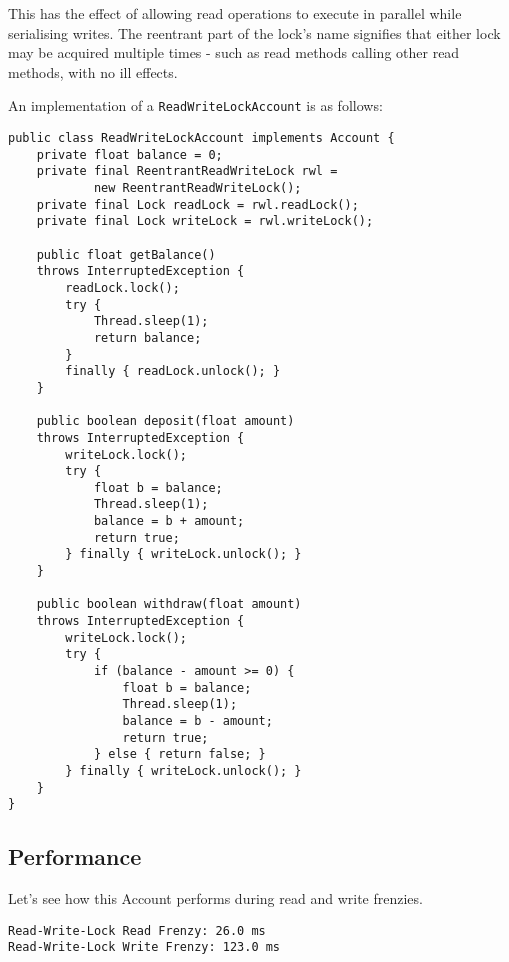 \documentclass[a4paper,12pt]{kth-mag}
\begin{document}
This has the effect of allowing read operations to execute in parallel while serialising writes. The reentrant part of the lock's name signifies that either lock may be acquired multiple times - such as read methods calling other read methods, with no ill effects.

An implementation of a \texttt{ReadWriteLockAccount} is as follows:

 \begin{listing}[H]
	\begin{verbatim}
public class ReadWriteLockAccount implements Account {
    private float balance = 0;
    private final ReentrantReadWriteLock rwl = 
    		new ReentrantReadWriteLock();
    private final Lock readLock = rwl.readLock();
    private final Lock writeLock = rwl.writeLock();

    public float getBalance() 
    throws InterruptedException {
        readLock.lock();
        try { 
            Thread.sleep(1);
            return balance; 
        }
        finally { readLock.unlock(); }
    }

    public boolean deposit(float amount) 
    throws InterruptedException {
        writeLock.lock();
        try {
            float b = balance;
            Thread.sleep(1);
            balance = b + amount;    
            return true;
        } finally { writeLock.unlock(); }
    }

    public boolean withdraw(float amount)
    throws InterruptedException {
        writeLock.lock();
        try {
            if (balance - amount >= 0) {
                float b = balance;
                Thread.sleep(1);
                balance = b - amount;
                return true;
            } else { return false; }
        } finally { writeLock.unlock(); }
    }
}
	\end{verbatim}
\end{listing}

\subsection{Performance}

Let's see how this Account performs during read and write frenzies.

\begin{listing}[H]
	\begin{verbatim}
Read-Write-Lock Read Frenzy: 26.0 ms
Read-Write-Lock Write Frenzy: 123.0 ms
	\end{verbatim}
\end{listing}
\end{document}
